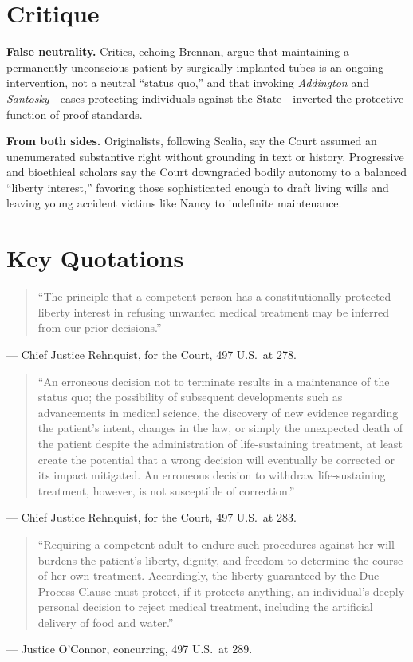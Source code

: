 \documentclass[12pt]{article}
\begin{document}
\section{Critique}

\textbf{False neutrality.} Critics, echoing Brennan, argue that maintaining a permanently unconscious patient by surgically implanted tubes is an ongoing intervention, not a neutral ``status quo,'' and that invoking \textit{Addington} and \textit{Santosky}---cases protecting individuals against the State---inverted the protective function of proof standards.

\textbf{From both sides.} Originalists, following Scalia, say the Court assumed an unenumerated substantive right without grounding in text or history. Progressive and bioethical scholars say the Court downgraded bodily autonomy to a balanced ``liberty interest,'' favoring those sophisticated enough to draft living wills and leaving young accident victims like Nancy to indefinite maintenance.

\section{Key Quotations}

\begin{quote}
``The principle that a competent person has a constitutionally protected liberty interest in refusing unwanted medical treatment may be inferred from our prior decisions.''
\end{quote}
\noindent --- Chief Justice Rehnquist, for the Court, 497 U.S.\ at 278.

\begin{quote}
``An erroneous decision not to terminate results in a maintenance of the status quo; the possibility of subsequent developments such as advancements in medical science, the discovery of new evidence regarding the patient's intent, changes in the law, or simply the unexpected death of the patient despite the administration of life-sustaining treatment, at least create the potential that a wrong decision will eventually be corrected or its impact mitigated. An erroneous decision to withdraw life-sustaining treatment, however, is not susceptible of correction.''
\end{quote}
\noindent --- Chief Justice Rehnquist, for the Court, 497 U.S.\ at 283.

\begin{quote}
``Requiring a competent adult to endure such procedures against her will burdens the patient's liberty, dignity, and freedom to determine the course of her own treatment. Accordingly, the liberty guaranteed by the Due Process Clause must protect, if it protects anything, an individual's deeply personal decision to reject medical treatment, including the artificial delivery of food and water.''
\end{quote}
\noindent --- Justice O'Connor, concurring, 497 U.S.\ at 289.
\end{document}

